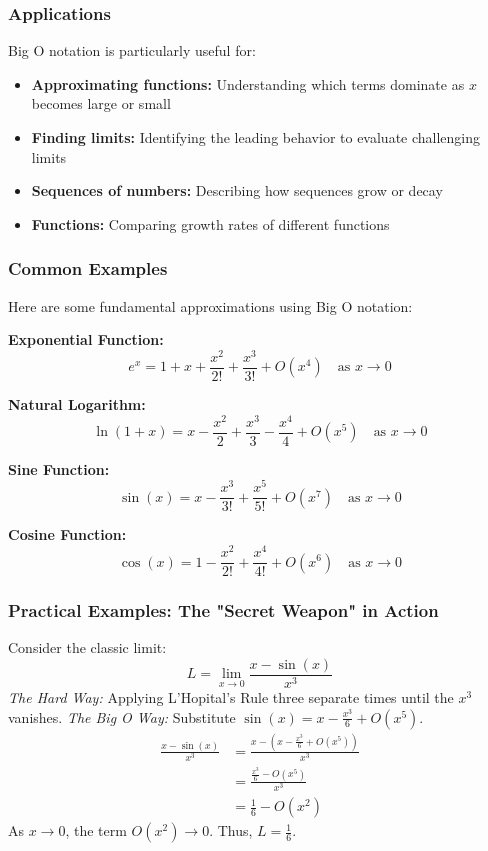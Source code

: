 \documentclass[12pt]{article}
\begin{document}
\subsubsection{Applications}
Big O notation is particularly useful for:
\begin{itemize}[leftmargin=*]
  \item \textbf{Approximating functions:} Understanding which terms dominate as $x$ becomes large or small
  \item \textbf{Finding limits:} Identifying the leading behavior to evaluate challenging limits
  \item \textbf{Sequences of numbers:} Describing how sequences grow or decay
  \item \textbf{Functions:} Comparing growth rates of different functions
\end{itemize}

\subsubsection{Common Examples}
Here are some fundamental approximations using Big O notation:

\textbf{Exponential Function:}
\[e^x = 1 + x + \frac{x^2}{2!} + \frac{x^3}{3!} + O(x^4) \quad \text{as } x \to 0\]

\textbf{Natural Logarithm:}
\[\ln(1+x) = x - \frac{x^2}{2} + \frac{x^3}{3} - \frac{x^4}{4} + O(x^5) \quad \text{as } x \to 0\]

\textbf{Sine Function:}
\[\sin(x) = x - \frac{x^3}{3!} + \frac{x^5}{5!} + O(x^7) \quad \text{as } x \to 0\]

\textbf{Cosine Function:}
\[\cos(x) = 1 - \frac{x^2}{2!} + \frac{x^4}{4!} + O(x^6) \quad \text{as } x \to 0\]

\subsubsection{Practical Examples: The "Secret Weapon" in Action}


\begin{example}
Consider the classic limit:
\[ L = \lim_{x \to 0} \frac{x - \sin(x)}{x^3} \]
\textit{The Hard Way:} Applying L'Hopital's Rule three separate times until the $x^3$ vanishes.
\textit{The Big O Way:} Substitute $\sin(x) = x - \frac{x^3}{6} + O(x^5)$.
\begin{align*}
    \frac{x - \sin(x)}{x^3} &= \frac{x - \left(x - \frac{x^3}{6} + O(x^5)\right)}{x^3} \\
    &= \frac{\frac{x^3}{6} - O(x^5)}{x^3} \\
    &= \frac{1}{6} - O(x^2)
\end{align*}
As $x \to 0$, the term $O(x^2) \to 0$. Thus, $L = \frac{1}{6}$.
\end{example}
\end{document}
